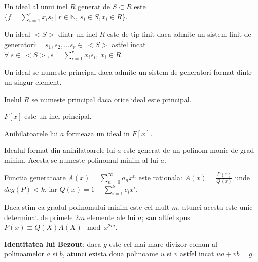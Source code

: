 \begin{defn}
  Un ideal al unui inel $R$ generat de $S \subset R$ este
  $\{f = \displaystyle\sum\limits_{i=1}^{r} x_{i}s_{i} \ | \ r \in \mathbb{N}, \ s_{i} \in S, x_{i} \in R\}$.
\end{defn}

\begin{defn}
  Un ideal $<S>$ dintr-un inel $R$ este de tip finit daca admite un sistem finit de generatori:
  $\exists \ s_{1}, s_{2}, \ldots s_{r} \in \ <S>$  astfel incat
  $\forall \ s \in \ <S>, s = \displaystyle\sum\limits_{i=1}^{r} x_{i} s_{i}, \ x_{i} \in R$.
\end{defn}

\begin{defn}
  Un ideal se numeste principal daca admite un sistem de generatori format
  dintr-un singur element.
\end{defn}

\begin{defn}
  Inelul $R$ se numeste principal daca orice ideal este principal.
\end{defn}

\begin{thm}
  $F[x]$ este un inel principal.
\end{thm}

\begin{lem}
  Anihilatoarele lui $a$ formeaza un ideal in $F[x]$.
\end{lem}

\begin{clr}
  Idealul format din anihilatoarele lui $a$ este generat de un polinom monic de
  grad minim. Acesta se numeste polinomul minim al lui $a$.
\end{clr}

\begin{thm}
  Functia generatoare $A(x) = \displaystyle\sum\limits_{n=0}^{\infty} a_{n}x^{n}$ este rationala:
  $A(x) = \frac{P(x)}{Q(x)}$ unde $deg(P) < k$, iar $Q(x) = 1 - \displaystyle\sum\limits_{i=1}^{k} c_{i}x^{i}$.
\end{thm}

\begin{thm}
  Daca stim ca gradul polinomului minim este cel mult $m$, atunci acesta este
  unic determinat de primele $2m$ elemente ale lui $a$; sau altfel spus
  $P(x) \equiv Q(X) A(X) \mod x^{2m}$.
\end{thm}

\noindent \textbf{Identitatea lui Bezout}: daca $g$ este cel mai mare divizor comun al
polinoamelor $a$ si $b$, atunci exista doua polinoame $u$ si $v$ astfel incat
$ua + vb = g$.

